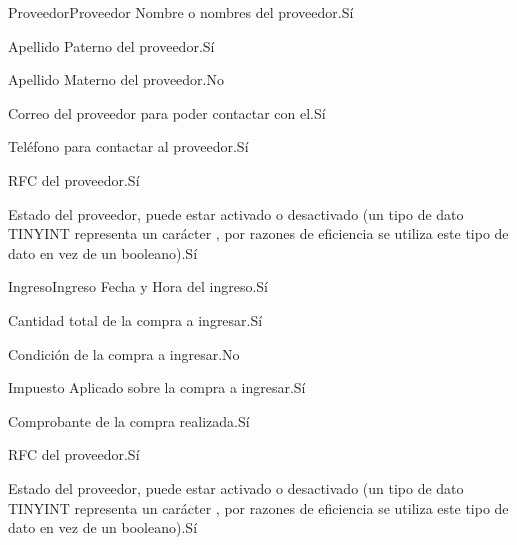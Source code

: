\begin{cdtEntidad}{Proveedor}{Proveedor}
		{Nombre o nombres del proveedor.}{Sí}
		
		{Apellido Paterno del proveedor.}{Sí}
		
		{Apellido Materno del proveedor.}{No}

		{Correo del proveedor para poder contactar con el.}{Sí}
		
		{Teléfono para contactar al proveedor.}{Sí}
		
		{RFC del proveedor.}{Sí}
	
		{Estado del proveedor, puede estar activado o desactivado (un tipo de dato TINYINT representa un carácter , por razones de eficiencia se utiliza este tipo de dato en vez de un booleano).}{Sí}	
\end{cdtEntidad}


\begin{cdtEntidad}{Ingreso}{Ingreso}
		{Fecha y Hora del ingreso.}{Sí}
		
		{Cantidad total de la compra a ingresar.}{Sí}
		
		{Condición de la compra a ingresar.}{No}

		{Impuesto Aplicado sobre la compra a ingresar.}{Sí}
		
		{Comprobante de la compra realizada.}{Sí}
		
		{RFC del proveedor.}{Sí}
	
		{Estado del proveedor, puede estar activado o desactivado (un tipo de dato TINYINT representa un carácter , por razones de eficiencia se utiliza este tipo de dato en vez de un booleano).}{Sí}	
		
		\cdtEntityRelSection
\end{cdtEntidad}








